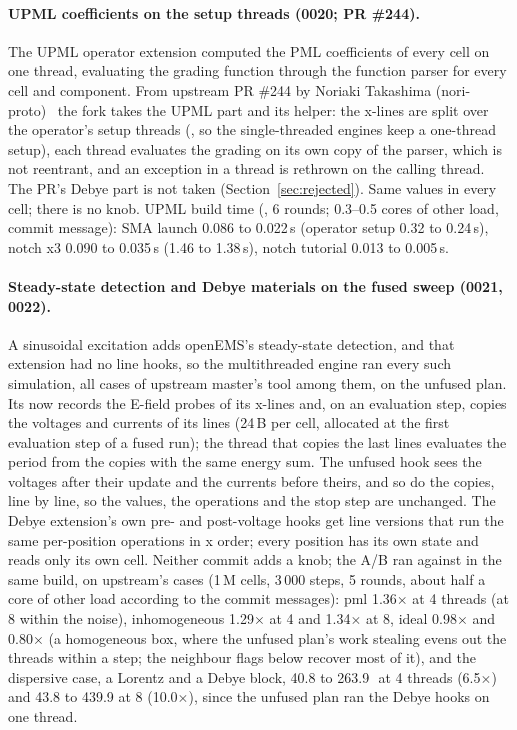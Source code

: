 \paragraph{UPML coefficients on the setup threads (0020; PR \#244).} The UPML operator extension computed the PML
coefficients of every cell on one thread, evaluating the grading function through the function parser for every cell
and component. From upstream PR \#244 by Noriaki Takashima (nori-proto)~\cite{pr244} the fork takes the UPML part and
its  helper: the x-lines are split over the operator's setup threads
(, so the single-threaded engines keep a one-thread setup), each thread evaluates the
grading on its own copy of the parser, which is not reentrant, and an exception in a thread is rethrown on the calling
thread. The PR's Debye part is not taken (Section~\ref{sec:rejected}). Same values in every cell; there is no knob.
UPML build time (, 6 rounds; 0.3--0.5 cores of other load, commit message): SMA launch
0.086 to 0.022\,s (operator setup 0.32 to 0.24\,s), notch x3 0.090 to 0.035\,s (1.46 to 1.38\,s), notch tutorial
0.013 to 0.005\,s.

\paragraph{Steady-state detection and Debye materials on the fused sweep (0021, 0022).} A sinusoidal excitation adds
openEMS's steady-state detection, and that extension had no line hooks, so the multithreaded engine ran every such
simulation, all cases of upstream master's  tool among them, on the unfused plan. Its
 now records the E-field probes of its x-lines and, on an evaluation step, copies the
voltages and currents of its lines (24\,B per cell, allocated at the first evaluation step of a fused run); the thread
that copies the last lines evaluates the period from the copies with the same energy sum. The unfused hook sees the
voltages after their update and the currents before theirs, and so do the copies, line by line, so the values, the
operations and the stop step are unchanged. The Debye extension's own pre- and post-voltage hooks get line versions
that run the same per-position operations in x order; every position has its own state and reads only its own cell.
Neither commit adds a knob; the A/B ran against  in the same build, on upstream's cases (1\,M
cells, 3\,000 steps, 5 rounds, about half a core of other load according to the commit messages): pml 1.36$\times$ at 4
threads (at 8 within the noise), inhomogeneous 1.29$\times$ at 4 and 1.34$\times$ at 8, ideal 0.98$\times$ and
0.80$\times$ (a homogeneous box, where the unfused plan's work stealing evens out the threads within a step; the
neighbour flags below recover most of it), and the dispersive case, a Lorentz and a Debye block, 40.8 to 263.9\,\MC\ at
4 threads (6.5$\times$) and 43.8 to 439.9 at 8 (10.0$\times$), since the unfused plan ran the Debye hooks on one thread.

